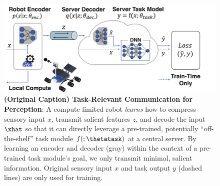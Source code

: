 \begin{figure}[ht]
    \centering
    \includegraphics[width=1.0\columnwidth]{pics/tasknet_block_diagram.pdf}
    \caption{\small{\textbf{(Original Caption) Task-Relevant Communication for Perception}: 
    A compute-limited robot \textit{learns} how to compress sensory input $x$, transmit salient features $z$, and decode the input $\xhat$ so that it can directly leverage a pre-trained, potentially ``off-the-shelf'' task module $f(;\thetatask)$ at a central server.
By learning an encoder and decoder (gray) within the context of a pre-trained task module's goal, we only transmit minimal, salient information. 
Original sensory input $x$ and task output $y$ (dashed lines) are only used for training.} \newline
    \small{}}
    \label{fig:task_autoencoder}
\vspace{-1em}
\end{figure}
